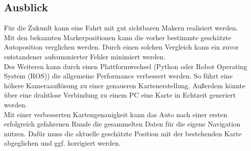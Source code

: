 \begin{figure}[htp]

\end{figure}


\subsection{Ausblick}
Für die Zukunft kann eine Fahrt mit gut sichtbaren Makern realisiert werden. Mit den bekannten Markerpositionen kann die vorher bestimmte geschätzte Autoposition verglichen werden. Durch einen solchen Vergleich kann ein zuvor entstandener aufsummierter Fehler minimiert werden. \\
Des Weiteren kann durch einen Plattformwechsel (Python oder Robot Operating System (ROS)) die allgemeine Performance verbessert werden.  So führt eine höhere Kameraauflösung zu einer genaueren Kartenerstellung. Außerdem könnte über eine drahtlose Verbindung zu einem PC eine Karte in Echtzeit generiert werden.   \\
Mit einer verbesserten Kartengenauigkeit kann das Auto nach einer ersten erfolgreich gefahrenen Runde die gesammelten Daten für die eigene Navigation nutzen. Dafür muss die aktuelle geschätzte Position mit der bestehenden Karte abgeglichen und ggf. korrigiert werden.\\

